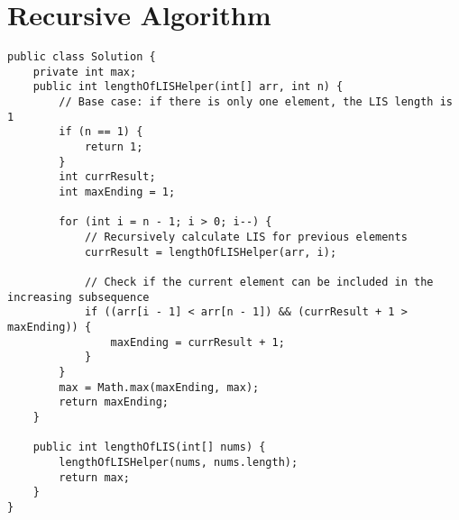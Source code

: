 \documentclass{article}
\begin{document}
\clearpage %
\section{Recursive Algorithm}
\begin{lstlisting}[caption=$\mathcal{O}(2^{n})$ Recursive Algorithm]
public class Solution {
	private int max;
	public int lengthOfLISHelper(int[] arr, int n) {
		// Base case: if there is only one element, the LIS length is 1
		if (n == 1) {
			return 1;
		}
		int currResult;
		int maxEnding = 1;
		
		for (int i = n - 1; i > 0; i--) {
			// Recursively calculate LIS for previous elements
			currResult = lengthOfLISHelper(arr, i);
			
			// Check if the current element can be included in the increasing subsequence
			if ((arr[i - 1] < arr[n - 1]) && (currResult + 1 > maxEnding)) {
				maxEnding = currResult + 1;
			}
		}
		max = Math.max(maxEnding, max);
		return maxEnding;
	}
	
	public int lengthOfLIS(int[] nums) {
		lengthOfLISHelper(nums, nums.length);
		return max;
	}
}
\end{lstlisting}

\end{document}

